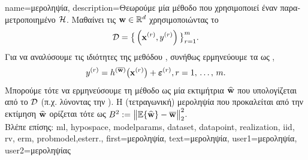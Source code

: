 {name={\foreignlanguage{greek}{μεροληψία}},
	description={\foreignlanguage{greek}{Θεωρούμε μία μέθοδο} 
		 \foreignlanguage{greek}{που χρησιμοποιεί έναν παραμετροποιημένο}  $\mathcal{H}$. 
		\foreignlanguage{greek}{Μαθαίνει τις}  ${\bf w} \in \mathbb{R}^{d}$ 
		\foreignlanguage{greek}{χρησιμοποιώντας το}  
		$$\mathcal{D}=\big\{ \left( {\bf x}^{(r)},y^{(r)} \right) \big\}_{r=1}^{m}.$$ 
		\foreignlanguage{greek}{Για να αναλύσουμε τις ιδιότητες της μεθόδου} , \foreignlanguage{greek}{συνήθως 
		ερμηνεύουμε τα}  \foreignlanguage{greek}{ως}   , 
		$$y^{(r)} = h^{(\overline{{\bf w}})}\big( {\bf x}^{(r)} \big) + \bm{\varepsilon}^{(r)}, r=1, \,\ldots, \,m.$$ 
		\foreignlanguage{greek}{Μπορούμε τότε να ερμηνεύσουμε τη μέθοδο}  \foreignlanguage{greek}{ως μία 
		εκτιμήτρια $\widehat{{\bf w}}$ που υπολογίζεται από το $\mathcal{D}$ (π.χ. λύνοντας την} ). 
		\foreignlanguage{greek}{Η (τετραγωνική) μεροληψία που προκαλείται από την εκτίμηση $\widehat{{\bf w}}$ ορίζεται τότε ως} 
		$B^{2} := \big\| \mathbb{E} \{ \widehat{{\bf w}}  \}- \overline{{\bf w}}\big\|_{2}^{2}$.\\
		\foreignlanguage{greek}{Βλέπε επίσης:} \gls{ml}, \gls{hypospace}, \gls{modelparams}, \gls{dataset}, \gls{datapoint}, \gls{realization}, \gls{iid}, 
		\gls{rv}, \gls{erm}, \gls{probmodel},\gls{esterr}.},
	first={\foreignlanguage{greek}{μεροληψία}},
	text={\foreignlanguage{greek}{μεροληψία}},
	user1={\foreignlanguage{greek}{μεροληψία}}, %
	user2={\foreignlanguage{greek}{μεροληψίας}} %
}

